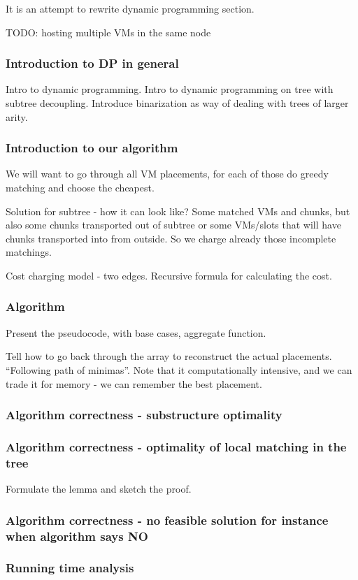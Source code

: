 It is an attempt to rewrite dynamic programming section.

TODO: hosting multiple VMs in the same node

\subsubsection{Introduction to DP in general}

Intro to dynamic programming. Intro to dynamic programming on tree with subtree decoupling.
Introduce binarization as way of dealing with trees of larger arity.

\subsubsection{Introduction to our algorithm}

We will want to go through all VM placements, for each of those do greedy matching and choose the cheapest.

Solution for subtree - how it can look like? Some matched VMs and chunks, but also some chunks transported out of subtree or some VMs/slots that will have chunks transported into from outside. So we charge already those incomplete matchings.

Cost charging model - two edges. Recursive formula for calculating the cost.

\subsubsection{Algorithm}

Present the pseudocode, with base cases, aggregate function.

Tell how to go back through the array to reconstruct the actual placements. ``Following path of minimas''.
Note that it computationally intensive, and we can trade it for memory - we can remember the best placement.

\subsubsection{Algorithm correctness - substructure optimality}

\subsubsection{Algorithm correctness - optimality of local matching in the tree}

Formulate the lemma and sketch the proof.

\subsubsection{Algorithm correctness - no feasible solution for instance when algorithm says NO}

\subsubsection{Running time analysis}
